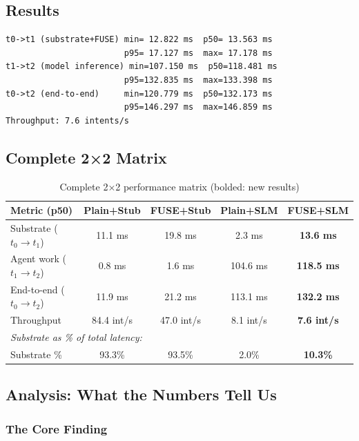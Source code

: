 \documentclass[11pt]{article}
\begin{document}
\subsection{Results}

\begin{lstlisting}
t0->t1 (substrate+FUSE) min= 12.822 ms  p50= 13.563 ms
                        p95= 17.127 ms  max= 17.178 ms
t1->t2 (model inference) min=107.150 ms  p50=118.481 ms
                        p95=132.835 ms  max=133.398 ms
t0->t2 (end-to-end)     min=120.779 ms  p50=132.173 ms
                        p95=146.297 ms  max=146.859 ms
Throughput: 7.6 intents/s
\end{lstlisting}

\subsection{Complete 2×2 Matrix}

\begin{table}[h]
\centering
\begin{tabular}{lcccc}
\toprule
\textbf{Metric (p50)} & \textbf{Plain+Stub} & \textbf{FUSE+Stub} & \textbf{Plain+SLM} & \textbf{FUSE+SLM} \\
\midrule
Substrate ($t_0 \rightarrow t_1$) & 11.1 ms & 19.8 ms & 2.3 ms & \textbf{13.6 ms} \\
Agent work ($t_1 \rightarrow t_2$) & 0.8 ms & 1.6 ms & 104.6 ms & \textbf{118.5 ms} \\
End-to-end ($t_0 \rightarrow t_2$) & 11.9 ms & 21.2 ms & 113.1 ms & \textbf{132.2 ms} \\
Throughput & 84.4 int/s & 47.0 int/s & 8.1 int/s & \textbf{7.6 int/s} \\
\midrule
\multicolumn{5}{l}{\textit{Substrate as \% of total latency:}} \\
\quad Substrate \% & 93.3\% & 93.5\% & 2.0\% & \textbf{10.3\%} \\
\bottomrule
\end{tabular}
\caption{Complete 2×2 performance matrix (bolded: new results)}
\end{table}

\subsection{Analysis: What the Numbers Tell Us}

\subsubsection{The Core Finding}
\end{document}
